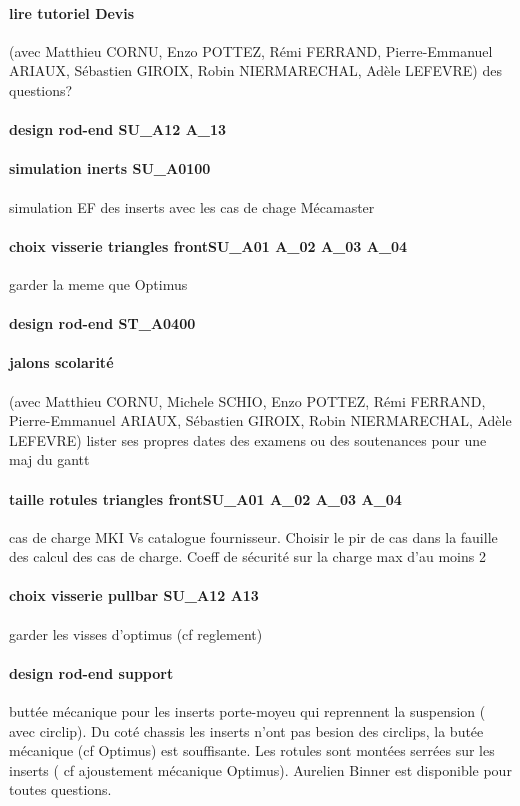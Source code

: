 \paragraph{lire tutoriel Devis} (avec Matthieu CORNU, Enzo POTTEZ, Rémi FERRAND, Pierre-Emmanuel ARIAUX, Sébastien GIROIX, Robin NIERMARECHAL, Adèle LEFEVRE) des questions?
\paragraph{design rod-end SU\_A12 A\_13} 
\paragraph{simulation inerts SU\_A0100} simulation EF des inserts avec les cas de chage Mécamaster
\paragraph{choix visserie triangles frontSU\_A01 A\_02 A\_03 A\_04} garder la meme que Optimus
\paragraph{design rod-end ST\_A0400} 
\paragraph{jalons scolarité} (avec Matthieu CORNU, Michele SCHIO, Enzo POTTEZ, Rémi FERRAND, Pierre-Emmanuel ARIAUX, Sébastien GIROIX, Robin NIERMARECHAL, Adèle LEFEVRE) lister ses propres dates des examens ou des soutenances pour une maj du gantt
\paragraph{taille rotules triangles frontSU\_A01 A\_02 A\_03 A\_04} cas de charge MKI Vs catalogue fournisseur. Choisir le pir de cas dans la fauille des calcul des cas de charge. Coeff de sécurité sur la charge max d'au moins 2
\paragraph{choix visserie pullbar SU\_A12 A13} garder les visses d'optimus (cf reglement)
\paragraph{design rod-end support} buttée mécanique pour les inserts porte-moyeu qui reprennent la suspension ( avec circlip). Du coté chassis les inserts n'ont pas besion des circlips, la butée mécanique (cf Optimus) est souffisante. Les rotules sont montées serrées sur les inserts ( cf ajoustement mécanique Optimus). Aurelien Binner est disponible pour toutes questions.

